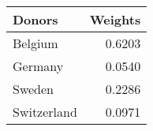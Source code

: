 \begin{tabular}{lr}
\toprule
     Donors &  Weights \\
\midrule
    Belgium &   0.6203 \\
    Germany &   0.0540 \\
     Sweden &   0.2286 \\
Switzerland &   0.0971 \\
\bottomrule
\end{tabular}

